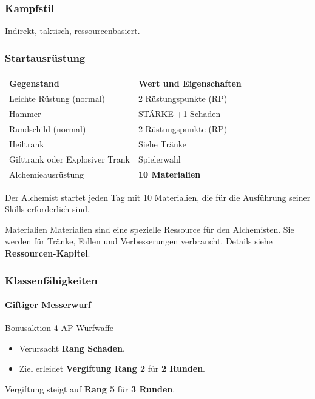 \subsubsection*{Kampfstil}
Indirekt, taktisch, ressourcenbasiert.

\subsubsection*{Startausrüstung}

\begin{center}
	\begin{tabular}{lp{9cm}}
		\toprule
		\textbf{Gegenstand} & \textbf{Wert und Eigenschaften} \\
		\midrule
		Leichte Rüstung (normal) & 2 Rüstungspunkte (RP) \\
		Hammer & STÄRKE +1 Schaden \\
		Rundschild (normal) & 2 Rüstungspunkte (RP) \\
		Heiltrank & Siehe Tränke \\
		Gifttrank oder Explosiver Trank & Spielerwahl \\
		Alchemieausrüstung & \textbf{10 Materialien} \\
		\bottomrule
	\end{tabular}
\end{center}

Der Alchemist startet jeden Tag mit 10 Materialien, die für die Ausführung seiner Skills
erforderlich sind.

\begin{rulebox}{Materialien}
	Materialien sind eine spezielle Ressource für den Alchemisten.
	Sie werden für Tränke, Fallen und Verbesserungen verbraucht.
	Details siehe \textbf{Ressourcen-Kapitel}.
\end{rulebox}

\subsubsection*{Klassenfähigkeiten}

\paragraph*{Giftiger Messerwurf}

\skillcard
{}
{Bonusaktion}
{4 AP}
{Wurfwaffe}
{—}
{
	\begin{itemize}
		\item Verursacht \textbf{Rang Schaden}.
		\item Ziel erleidet \textbf{Vergiftung Rang 2} für \textbf{2 Runden}.
	\end{itemize}
}
{
	Vergiftung steigt auf \textbf{Rang 5} für \textbf{3 Runden}.
}

